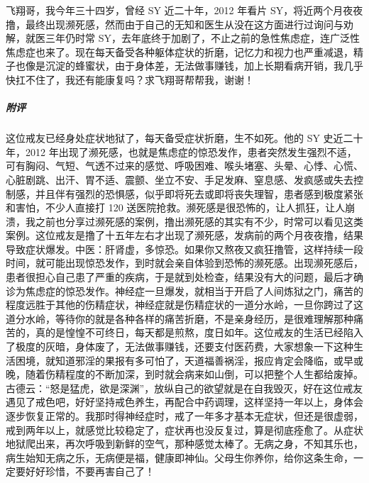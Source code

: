 \begin{case}
    飞翔哥，我今年三十四岁，曾经 SY 近二十年，2012 年看片 SY，将近两个月夜夜撸，最终出现濒死感，然而由于自己的无知和医生从没在这方面进行过询问与劝解，就医三年仍时常 SY，去年底终于加剧了，不止之前的急性焦虑症，连广泛性焦虑症也来了。现在每天备受各种躯体症状的折磨，记忆力和视力也严重减退，精子也像是沉淀的蜂蜜状，由于身体差，无法做事赚钱，加上长期看病开销，我几乎快扛不住了，我还有能康复吗？求飞翔哥帮帮我，谢谢！
    \subparagraph{附评} 这位戒友已经身处症状地狱了，每天备受症状折磨，生不如死。他的 SY 史近二十年，2012 年出现了濒死感，也就是焦虑症的惊恐发作，患者突然发生强烈不适，可有胸闷、气短、气透不过来的感觉、呼吸困难、喉头堵塞、头晕、心悸、心慌、心脏剧跳、出汗、胃不适、震颤、坐立不安、手足发麻、窒息感、发疯感或失去控制感，并且伴有强烈的恐惧感，似乎即将死去或即将丧失理智，患者感到极度紧张和害怕，不少人直接打 120 送医院抢救。濒死感是很恐怖的，让人抓狂，让人崩溃，我之前也分享过濒死感的案例，撸出濒死感的其实有不少，时常可以看见这类案例。这位戒友是撸了十五年左右才出现了濒死感，发病前的两个月夜夜撸，结果导致症状爆发。中医：肝肾虚，多惊恐。如果你又熬夜又疯狂撸管，这样持续一段时间，就可能出现惊恐发作，到时就会亲自体验到恐怖的濒死感。出现濒死感后，患者很担心自己患了严重的疾病，于是就到处检查，结果没有大的问题，最后才确诊为焦虑症的惊恐发作。神经症一旦爆发，就相当于开启了人间炼狱之门，痛苦的程度远胜于其他的伤精症状，神经症就是伤精症状的一道分水岭，一旦你跨过了这道分水岭，等待你的就是各种各样的痛苦折磨，不是亲身经历，是很难理解那种痛苦的，真的是惶惶不可终日，每天都是煎熬，度日如年。这位戒友的生活已经陷入了极度的灰暗，身体废了，无法做事赚钱，还要支付医药费，大家想象一下这种生活困境，就知道邪淫的果报有多可怕了，天道福善祸淫，报应肯定会降临，或早或晚，随着伤精程度的不断加深，到时就会病来如山倒，可以把整个人生都给废掉。古德云：“怒是猛虎，欲是深渊”，放纵自己的欲望就是在自我毁灭，好在这位戒友遇见了戒色吧，好好坚持戒色养生，再配合中药调理，这样坚持一年以上，身体会逐步恢复正常的。我那时得神经症时，戒了一年多才基本无症状，但还是很虚弱，戒到两年以上，就感觉比较稳定了，症状再也没反复过，算是彻底痊愈了。从症状地狱爬出来，再次呼吸到新鲜的空气，那种感觉太棒了。无病之身，不知其乐也，病生始知无病之乐，无病便是福，健康即神仙。父母生你养你，给你这条生命，一定要好好珍惜，不要再害自己了！
\end{case}

